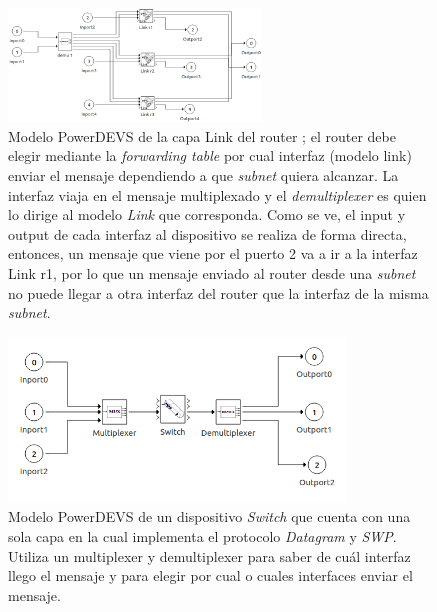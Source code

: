 \documentclass[10pt,a4paper]{article}
\begin{document}
\newpage

\begin{figure}[!htb]
    \centering
    \includegraphics[width = 0.6\textwidth]{img/png/powerdevs/router_interfaces.png}
    \caption{Modelo PowerDEVS de la capa Link del router ; el router debe elegir mediante la \textit{forwarding table} por cual interfaz (modelo link) enviar el mensaje dependiendo a que \textit{subnet} quiera alcanzar. La interfaz viaja en el mensaje multiplexado y el \textit{demultiplexer} es quien lo dirige al modelo \textit{Link} que corresponda. Como se ve, el input y output de cada interfaz al dispositivo se realiza de forma directa, entonces, un mensaje que viene por el puerto 2 va a ir a la interfaz Link r1, por lo que un mensaje enviado al router desde una \textit{subnet} no puede llegar a otra interfaz del router que la interfaz de la misma \textit{subnet}.}
    \label{figure: powerdevs interfaces}
\end{figure}

\begin{figure}[!htb]
    \centering
    \includegraphics[width = 0.8\textwidth]{img/png/powerdevs/switch.png}
    \caption{Modelo PowerDEVS de un dispositivo \textit{Switch} que cuenta con una sola capa en la cual implementa el protocolo \textit{Datagram} y \textit{SWP}. Utiliza un multiplexer y demultiplexer para saber de cuál interfaz llego el mensaje y para elegir por cual o cuales interfaces enviar el mensaje.}
    \label{figure: powerdevs switch}
\end{figure}

\newpage



\end{document}
